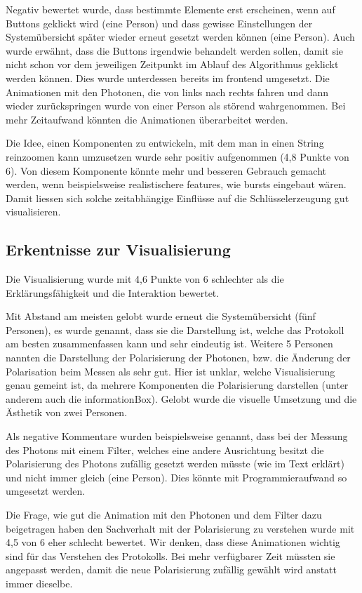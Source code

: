 \documentclass[a4paper,10.2pt,pdftex]{scrartcl}%
\begin{document}
Negativ bewertet wurde, dass bestimmte Elemente erst erscheinen, wenn auf Buttons geklickt wird (eine Person) und dass gewisse Einstellungen der Systemübersicht später wieder erneut gesetzt werden können (eine Person). Auch wurde erwähnt, dass die Buttons irgendwie behandelt werden sollen, damit sie nicht schon vor dem jeweiligen Zeitpunkt im Ablauf des Algorithmus geklickt werden können. Dies wurde unterdessen bereits im frontend umgesetzt. Die Animationen mit den Photonen, die von links nach rechts fahren und dann wieder zurückspringen wurde von einer Person als störend wahrgenommen. Bei mehr Zeitaufwand könnten die Animationen überarbeitet werden.

Die Idee, einen Komponenten zu entwickeln, mit dem man in einen String reinzoomen kann umzusetzen wurde sehr positiv aufgenommen (4,8 Punkte von 6). Von diesem Komponente könnte mehr und besseren Gebrauch gemacht werden, wenn beispielsweise realistischere features, wie bursts eingebaut wären. Damit liessen sich solche zeitabhängige Einflüsse auf die Schlüsselerzeugung gut visualisieren.
\subsection{Erkentnisse zur Visualisierung}
Die Visualisierung wurde mit 4,6 Punkte von 6 schlechter als die Erklärungsfähigkeit und die Interaktion bewertet.

Mit Abstand am meisten gelobt wurde erneut die Systemübersicht (fünf Personen), es wurde genannt, dass sie die Darstellung ist, welche das Protokoll am besten zusammenfassen kann und sehr eindeutig ist. Weitere 5 Personen nannten die Darstellung der Polarisierung der Photonen, bzw. die Änderung der Polarisation beim Messen als sehr gut. Hier ist unklar, welche Visualisierung genau gemeint ist, da mehrere Komponenten die Polarisierung darstellen (unter anderem auch die informationBox). Gelobt wurde die visuelle Umsetzung und die Ästhetik von zwei Personen.

Als negative Kommentare wurden beispielsweise genannt, dass bei der Messung des Photons mit einem Filter, welches eine andere Ausrichtung besitzt die Polarisierung des Photons zufällig gesetzt werden müsste (wie im Text erklärt) und nicht immer gleich (eine Person). Dies könnte mit Programmieraufwand so umgesetzt werden.

Die Frage, wie gut die Animation mit den Photonen und dem Filter dazu beigetragen haben den Sachverhalt mit der Polarisierung zu verstehen wurde mit 4,5 von 6 eher schlecht bewertet. Wir denken, dass diese Animationen wichtig sind für das Verstehen des Protokolls. Bei mehr verfügbarer Zeit müssten sie angepasst werden, damit die neue Polarisierung zufällig gewählt wird anstatt immer dieselbe.
\end{document}
